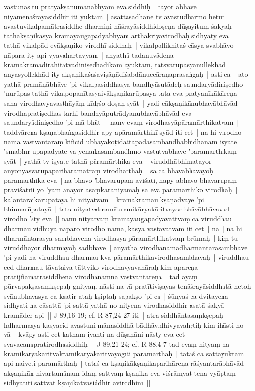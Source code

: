 \documentclass[article,12pt,a4paper]{memoir}
\begin{document}
vastunas tu pratyakṣānumānābhyām eva siddhiḥ | tayor abhāve niyamenāśrayāsiddhir iti yuktam | asattāsādhane tv avastudharmo hetur avastuvikalpamātrasiddhe dharmiṇi nāśrayāsiddhidoṣeṇa dūṣayituṃ śakyaḥ | tathākṣaṇikasya kramayaugapadyābhyām arthakriyāvirodhaḥ sidhyaty eva | \label{thakur75-93.22} tathā vikalpād evākṣaṇiko virodhī siddhaḥ | vikalpollikhitaś cāsya svabhāvo nāpara ity api vyavahartavyam | anyathā tadanuvādena kramākramādirahitatvādiniṣedhādikam ayuktam, tatsvarūpasyānullekhād anyasyollekhād ity akṣaṇikaśaśaviṣāṇādiśabdānuccāraṇaprasaṅgaḥ | asti ca | ato yathā pramāṇābhāve 'pi vikalpasiddhasya bandhyāsutādeḥ saundaryādiniṣedho 'nurūpas tathā vikalpopanītasyaivākṣaṇikarūpasya tata eva pratyanīkākāreṇa saha virodhavyavasthāyāṃ kīdṛśo doṣaḥ syāt | yadi cākṣaṇikānubhavābhāvād virodhapratiṣedhas tarhi bandhyāputrādyanubhavābhāvād eva saundaryādiniṣedho 'pi mā bhūt || \label{thakur75-94.5} nanv evaṃ virodhasyāpāramārthikatvam | taddvāreṇa kṣaṇabhaṅgasiddhir apy apāramārthikī syād iti cet | \label{thakur75-94.6} na hi virodho nāma vastvantaraṃ kiñcid ubhayakoṭidattapādasambandhābhidhānam iṣyate 'smābhir upapadyate vā yenaikasambandhino vastutvābhāve 'pāramārthikaṃ syāt | yathā tv iṣyate tathā pāramārthika eva | viruddhābhimatayor anyonyasvarūpaparihāramātraṃ virodhārthaḥ | sa ca bhāvābhāvayoḥ pāramārthika eva | na bhāvo 'bhāvarūpam āviśati, nāpy abhāvo bhāvarūpaṃ praviśatīti yo 'yam anayor asaṃkaraniyamaḥ sa eva pāramārthiko virodhaḥ | kālāntaraikarūpatayā hi nityatvam | kramākramau kṣaṇadvaye 'pi bhinnarūpatayā | tato nityatvakramākramikāryakāritvayor bhāvābhāvavad virodho 'sty eva || \label{thakur75-94.14} nanu nityatvaṃ kramayaugapadyavattvaṃ ca viruddhau dharmau vidhūya nāparo virodho nāma, kasya vāstavatvam iti cet | \label{thakur75-94.15} na | na hi dharmāntarasya sambhavena virodhasya pāramārthikatvaṃ brūmaḥ | kiṃ tu viruddhayor dharmayoḥ sadbhāve | anyathā virodhanāmadharmāntarasambhave 'pi yadi na viruddhau dharmau kva pāramārthikavirodhasambhavaḥ | viruddhau ced dharmau tāvataiva tāttviko virodhavyavahāraḥ kim apareṇa pratijñāmātrasiddhena virodhanāmnā vastvantareṇa | \label{thakur75-94.20} tad ayaṃ pūrvapakṣasaṃkṣepaḥ gnityaṃ nāsti na vā pratītiviṣayas tenāśrayāsiddhatā hetoḥ svānubhavasya ca kṣatir ataḥ kṣiptaḥ sapakṣo 'pi ca | śūnyaś ca dvitayena sidhyati na cāsattā 'pi sattā yathā no nityena virodhasiddhir asatā śakyā kramāder api || J 89,16-19; cf. R 87,24-27 iti | \label{thakur75-94.25} atra siddhāntasaṃkṣepaḥ hdharmasya kasyacid avastuni mānasiddhā bādhāvidhivyavahṛtiḥ kim ihāsti no vā | kvāpy asti cet katham iyanti na dūṣaṇāni nāsty eva cet svavacanapratirodhasiddhiḥ || J 89,21-24; cf. R 88,4-7 \label{thakur75-95.1} tad evaṃ nityaṃ na kramikāryakāritvākramikāryakāritvayogīti paramārthaḥ | tataś ca sattāyuktam api naiveti paramārthaḥ | tataś ca kṣaṇikākṣaṇikaparihāreṇa rāśyantarābhāvād akṣaṇikān nivartamānam idaṃ sattvaṃ kṣaṇika eva viśrāmyat tena vyāptaṃ sidhyatīti sattvāt kṣaṇikatvasiddhir avirodhinī ||
	\pend
      
\end{document}
